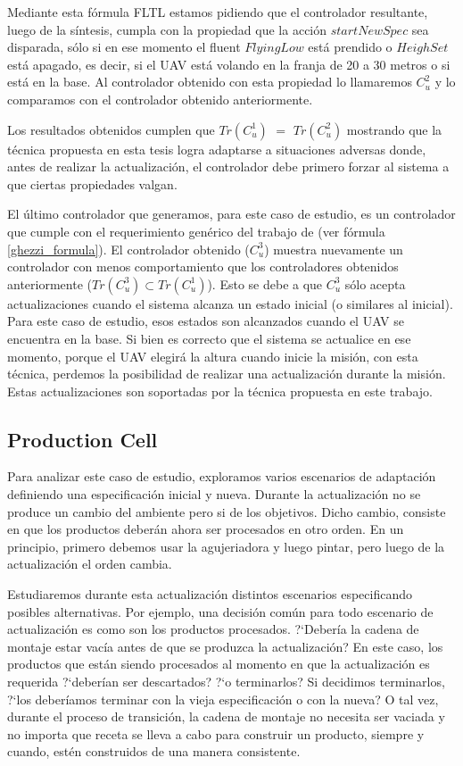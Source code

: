 Mediante esta fórmula FLTL estamos pidiendo que el controlador resultante, luego de la síntesis, cumpla con la propiedad
que la acción $startNewSpec$ sea disparada, sólo si en ese momento el fluent $FlyingLow$ está prendido o $HeighSet$
está apagado, es decir, si el UAV está volando en la franja de 20 a 30 metros o si está en la base. Al controlador
obtenido con esta propiedad lo llamaremos $C_u^2$ y lo comparamos con el controlador obtenido anteriormente.

Los resultados obtenidos cumplen que $Tr(C_u^1)$ $=$ $Tr(C_u^2)$ mostrando que la técnica propuesta en esta tesis logra
adaptarse a situaciones adversas donde, antes de realizar la actualización, el controlador debe primero forzar al
sistema a que ciertas propiedades valgan.

El último controlador que generamos, para este caso de estudio, es un controlador que cumple con el requerimiento genérico
del trabajo de \cite{6224401} (ver fórmula \ref{ghezzi_formula}). El controlador obtenido ($C_u^3$) muestra nuevamente
un controlador con menos comportamiento que los controladores obtenidos anteriormente ($Tr(C_u^3) \subset Tr(C_u^1)$).
Esto se debe a que $C_u^3$ sólo acepta actualizaciones cuando el sistema alcanza un estado inicial (o similares al
inicial). Para este caso de estudio, esos estados son alcanzados cuando el UAV se encuentra en la base. Si bien es
correcto que el sistema se actualice en ese momento, porque el UAV elegirá la altura cuando inicie la misión, con esta
técnica, perdemos la posibilidad de realizar una actualización durante la misión. Estas actualizaciones son
soportadas por la técnica propuesta en este trabajo.

\subsection{Production Cell}

Para analizar este caso de estudio, exploramos varios escenarios de adaptación definiendo una especificación inicial y
nueva. Durante la actualización no se produce un cambio del ambiente pero si de los objetivos. Dicho cambio, consiste en
que los productos deberán ahora ser procesados en otro orden. En un principio, primero debemos usar la agujeriadora y
luego pintar, pero luego de la actualización el orden cambia. 

Estudiaremos durante esta actualización distintos escenarios especificando posibles alternativas. Por ejemplo, una
decisión común para todo escenario de actualización es como son los productos procesados. ?`Debería la cadena de montaje
estar vacía antes de que se produzca la actualización? En este caso, los productos que están siendo procesados al
momento en que la actualización es requerida ?`deberían ser descartados? ?`o terminarlos? Si decidimos terminarlos,
?`los deberíamos terminar con la vieja especificación o con la nueva? O tal vez, durante el proceso de transición, la
cadena de montaje no necesita ser vaciada y no importa que receta se lleva a cabo para construir un producto, siempre y
cuando, estén construidos de una manera consistente. 

